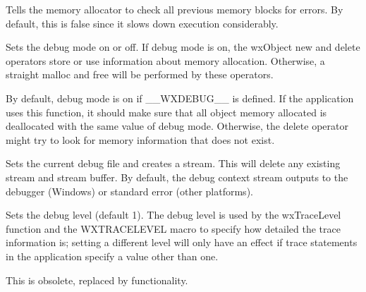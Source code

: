 \label{wxdebugcontextsetcheckprevious}


Tells the memory allocator to check all previous memory blocks for errors.
By default, this is false since it slows down execution considerably.



\label{wxdebugcontextsetdebugmode}


Sets the debug mode on or off. If debug mode is on, the wxObject new and delete
operators store or use information about memory allocation. Otherwise,
a straight malloc and free will be performed by these operators.

By default, debug mode is on if \_\_WXDEBUG\_\_ is defined. If the application
uses this function, it should make sure that all object memory allocated
is deallocated with the same value of debug mode. Otherwise, the
delete operator might try to look for memory information that does not
exist.



\label{wxdebugcontextsetfile}


Sets the current debug file and creates a stream. This will delete any existing
stream and stream buffer. By default, the debug context stream
outputs to the debugger (Windows) or standard error (other platforms).

\label{wxdebugcontextsetlevel}


Sets the debug level (default 1). The debug level is used by the wxTraceLevel function and
the WXTRACELEVEL macro to specify how detailed the trace information is; setting
a different level will only have an effect if trace statements in the application
specify a value other than one.

This is obsolete, replaced by  functionality.

